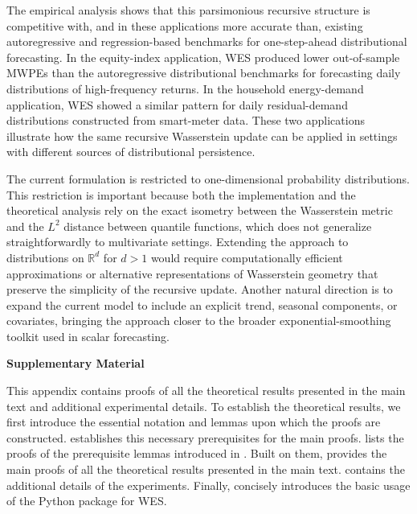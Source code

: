 \documentclass[a4paper, 11pt]{article}
\newcommand{\R}{\mathbb{R}}
\theoremstyle{definition}
\begin{document}
The empirical analysis shows that this parsimonious recursive structure is competitive with, and in these applications more accurate than, existing autoregressive and regression-based benchmarks for one-step-ahead distributional forecasting. 
In the equity-index application, WES produced lower out-of-sample MWPEs than the autoregressive distributional benchmarks for forecasting daily distributions of high-frequency returns. 
In the household energy-demand application, WES showed a similar pattern for daily residual-demand distributions constructed from smart-meter data. 
These two applications illustrate how the same recursive Wasserstein update can be applied in settings with different sources of distributional persistence.

The current formulation is restricted to one-dimensional probability distributions. 
This restriction is important because both the implementation and the theoretical analysis rely on the exact isometry between the Wasserstein metric and the $L^2$ distance between quantile functions, which does not generalize straightforwardly to multivariate settings. 
Extending the approach to distributions on $\R^d$ for $d>1$ would require computationally efficient approximations or alternative representations of Wasserstein geometry that preserve the simplicity of the recursive update. 
Another natural direction is to expand the current model to include an explicit trend, seasonal components, or covariates, bringing the approach closer to the broader exponential-smoothing toolkit used in scalar forecasting.


 

\newpage
\appendix

\setcounter{figure}{0}
\setcounter{table}{0}
\setcounter{equation}{0}

\renewcommand{\thefigure}{S\arabic{figure}}
\renewcommand{\thetable}{S\arabic{table}}
\renewcommand{\theequation}{S\arabic{equation}}

\begin{center}
	\LARGE \textbf{Supplementary Material}
\end{center}

\vspace{30pt}

This appendix contains proofs of all the theoretical results presented in the main text and additional experimental details.
To establish the theoretical results, we first introduce the essential notation and lemmas upon which the proofs are constructed.
 establishes this necessary prerequisites for the main proofs.
 lists the proofs of the prerequisite lemmas introduced in .
Built on them,  provides the main proofs of all the theoretical results presented in the main text.
 contains the additional details of the experiments.
Finally,  concisely introduces the basic usage of the Python package for WES.
\end{document}
